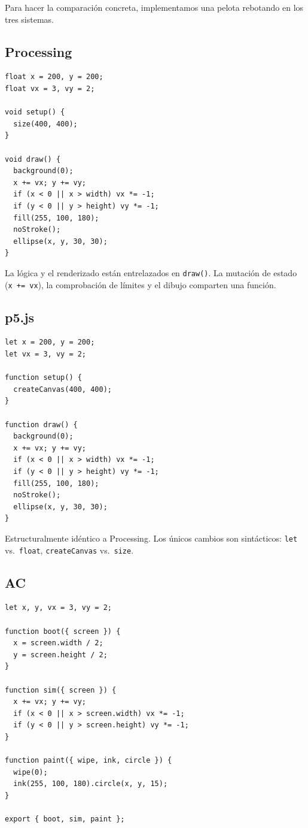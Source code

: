 \documentclass[10pt,letterpaper,twocolumn]{article}
\begin{document}
Para hacer la comparación concreta, implementamos una pelota rebotando en los tres sistemas.

\subsection{Processing}

\begin{lstlisting}[style=processingstyle]
float x = 200, y = 200;
float vx = 3, vy = 2;

void setup() {
  size(400, 400);
}

void draw() {
  background(0);
  x += vx; y += vy;
  if (x < 0 || x > width) vx *= -1;
  if (y < 0 || y > height) vy *= -1;
  fill(255, 100, 180);
  noStroke();
  ellipse(x, y, 30, 30);
}
\end{lstlisting}

La lógica y el renderizado están entrelazados en \texttt{draw()}. La mutación de estado (\texttt{x += vx}), la comprobación de límites y el dibujo comparten una función.

\subsection{p5.js}

\begin{lstlisting}[style=p5style]
let x = 200, y = 200;
let vx = 3, vy = 2;

function setup() {
  createCanvas(400, 400);
}

function draw() {
  background(0);
  x += vx; y += vy;
  if (x < 0 || x > width) vx *= -1;
  if (y < 0 || y > height) vy *= -1;
  fill(255, 100, 180);
  noStroke();
  ellipse(x, y, 30, 30);
}
\end{lstlisting}

Estructuralmente idéntico a Processing. Los únicos cambios son sintácticos: \texttt{let} vs.\ \texttt{float}, \texttt{createCanvas} vs.\ \texttt{size}.

\subsection{AC}

\begin{lstlisting}[style=acjsstyle]
let x, y, vx = 3, vy = 2;

function boot({ screen }) {
  x = screen.width / 2;
  y = screen.height / 2;
}

function sim({ screen }) {
  x += vx; y += vy;
  if (x < 0 || x > screen.width) vx *= -1;
  if (y < 0 || y > screen.height) vy *= -1;
}

function paint({ wipe, ink, circle }) {
  wipe(0);
  ink(255, 100, 180).circle(x, y, 15);
}

export { boot, sim, paint };
\end{lstlisting}
\end{document}
